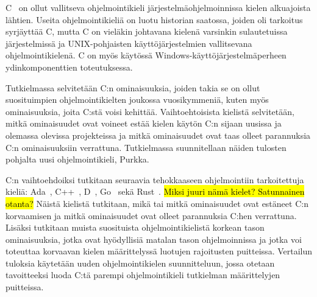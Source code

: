 C~\citep{C18} on ollut vallitseva ohjelmointikieli järjestelmäohjelmoinnissa
kielen alkuajoista lähtien. Useita ohjelmointikieliä on luotu historian
saatossa, joiden oli tarkoitus syrjäyttää C, mutta C on vieläkin johtavana
kielenä varsinkin sulautetuissa järjestelmissä ja UNIX-pohjaisten
käyttöjärjestelmien vallitsevana ohjelmointikielenä. C on myös käytössä
Windows-käyttöjärjestelmäperheen ydinkomponenttien toteutuksessa.

Tutkielmassa selvitetään C:n ominaisuuksia, joiden takia se on ollut
suosituimpien ohjelmointikielten joukossa vuosikymmeniä, kuten myös
ominaisuuksia, joita C:stä voisi kehittää. Vaihtoehtoisista kielistä
selvitetään, mitkä ominaisuudet ovat voineet estää kielen käytön C:n sijaan
uusissa ja olemassa olevissa projekteissa ja mitkä ominaisuudet ovat taas
olleet parannuksia C:n ominaisuuksiin verrattuna. Tutkielmassa suunnitellaan
näiden tulosten pohjalta uusi ohjelmointikieli, Purkka.

C:n vaihtoehdoiksi tutkitaan seuraavia tehokkaaseen ohjelmointiin tarkoitettuja
kieliä: Ada~\citep{ADA12}, C++~\citep{CPP17}, D~\citep{D}, Go~\citep{golang}
sekä Rust~\citep{rust}. \hl{Miksi juuri nämä kielet? Satunnainen otanta?}
Näistä kielistä tutkitaan, mikä tai mitkä ominaisuudet ovat estäneet C:n
korvaamisen ja mitkä ominaisuudet ovat olleet parannuksia C:hen verrattuna.
Lisäksi tutkitaan muista suosituista ohjelmointikielistä korkean tason
ominaisuuksia, jotka ovat hyödyllisiä matalan tason ohjelmoinnissa ja jotka voi
toteuttaa korvaavan kielen määrittelyssä luotujen rajoitusten puitteissa.
Vertailun tuloksia käytetään uuden ohjelmointikielen suunnitteluun, jossa
otetaan tavoitteeksi luoda C:tä parempi ohjelmointikieli tutkielman
määrittelyjen puitteissa.


